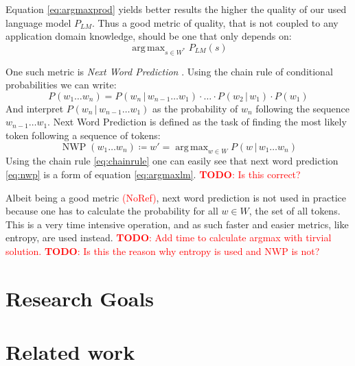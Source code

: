 \documentclass[11pt,a4paper]{article}
\newcommand\givenbase[1][]{\,#1\lvert\,}
\let\given\givenbase
\DeclareMathOperator*{\argmax}{arg\,max}
\newcommand{\probSymbol}[1][]{P_{#1}}
\newcommand{\prob}[2][]{\probSymbol[#1](#2)}
\newcommand{\probCond}[3][]{\prob[#1]{#2 \given #3}}
\newcommand{\nwp}[1]{\operatorname{NWP}(#1)}
\newcommand{\todo}[1]{\textcolor{red}{\textbf{TODO}: #1}}
\newcommand{\noref}{\textcolor{red}{(NoRef)}}
\begin{document}
Equation \eqref{eq:argmaxprod} yields better results the higher the quality of our
used language model $\probSymbol[LM]$.
Thus a good metric of quality, that is not coupled to any application domain
knowledge, should be one that only depends on:
\begin{equation}\label{eq:argmaxlm}
  \argmax_{s \in W^*} \prob[LM]{s}
\end{equation}

One such metric is \emph{Next Word Prediction} \parencite{Shannon1951}.
Using the chain rule of conditional probabilities we can write:
\begin{equation}\label{eq:chainrule}
  \prob{w_1 \ldots w_n} = \probCond{w_n}{w_{n-1} \ldots w_1} \cdot \ldots
                          \cdot \probCond{w_2}{w_1} \cdot \prob{w_1}
\end{equation}
And interpret $\probCond{w_n}{w_{n-1} \dots w_1}$ as the probability of $w_n$
following the sequence $w_{n-1} \ldots w_1$. Next Word Prediction is defined as
the task of finding the most likely token following a sequence of tokens:
\begin{equation}\label{eq:nwp}
  \nwp{w_1 \dots w_n} \coloneqq w' = \argmax_{w \in W} \probCond{w}{w_1 \ldots w_n}
\end{equation}
Using the chain rule \eqref{eq:chainrule} one can easily see that next word
prediction \eqref{eq:nwp} is a form of equation \eqref{eq:argmaxlm}.
\todo{Is this correct?}

Albeit being a good metric \noref, next word prediction is not used in practice
because one has to calculate the probability for all $w \in W$, the set of all
tokens.
This is a very time intensive operation, and as such faster and easier metrics,
like entropy, are used instead.
\todo{Add time to calculate argmax with tirvial solution.}
\todo{Is this the reason why entropy is used and NWP is not?}

\section{Research Goals}

\section{Related work}

\end{document}
